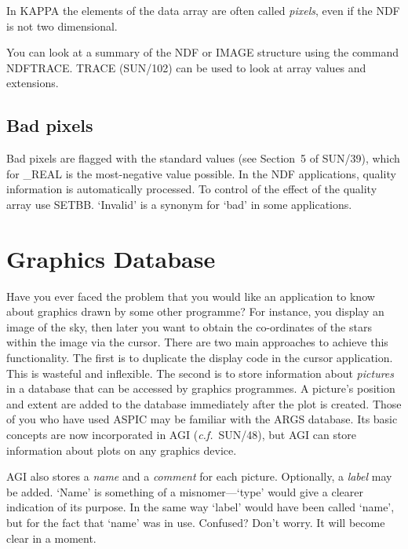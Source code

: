 In {\small KAPPA} the elements of the data array
are often called {\em pixels}, even if the NDF is not two dimensional.

You can look at a summary of the NDF or IMAGE structure using the
command NDFTRACE. {\small TRACE} (SUN/102) can be used to look at
array values and extensions.

\subsection{Bad pixels}
Bad pixels are flagged with the standard values (see Section~5 of
SUN/39), which for \_REAL is the most-negative value possible.
In the NDF applications, quality information is automatically
processed.  To control of the effect of the quality array use SETBB.
`Invalid' is a synonym for `bad' in some applications.

\newpage
\section{Graphics Database}
\label{se:agitate}
Have you ever faced the problem that you would like an application to know
about graphics drawn by some other programme?  For instance, you display an
image of the sky, then later you want to obtain the co-ordinates of the
stars within the image via the cursor.  There are two main approaches to
achieve this functionality. The first is to duplicate the display code in
the cursor application.  This is wasteful and inflexible.  The second is to
store information about {\em pictures\/} in a database that can be accessed
by graphics programmes.  A picture's position and extent are added to the
database immediately after the plot is created. Those of you who have used
{\small ASPIC} may be familiar with the ARGS database. Its basic concepts
are now incorporated in AGI ({\it c.f.}\ SUN/48), but AGI can store
information about plots on any graphics device.

AGI also stores a {\em name\/} and a {\em comment\/} for each picture. Optionally,
a {\em label\/} may be added. `Name' is something of a misnomer---`type'
would give a clearer indication of its purpose.  In the same way `label'
would have been called `name', but for the fact that `name' was in use.
Confused? Don't worry. It will become clear in a moment.

